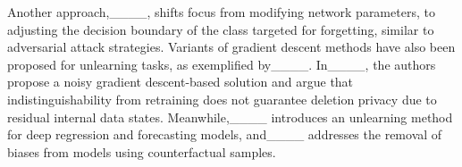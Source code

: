 Another approach,____, shifts focus from modifying network parameters, to adjusting the decision boundary of the class targeted for forgetting, similar to adversarial attack strategies. Variants of gradient descent methods have also been proposed for unlearning tasks, as exemplified by____. In____, the authors propose a noisy gradient descent-based solution and argue that indistinguishability from retraining does not guarantee deletion privacy due to residual internal data states. Meanwhile,____ introduces an unlearning method for deep regression and forecasting models, and____ addresses the removal of biases from models using counterfactual samples.